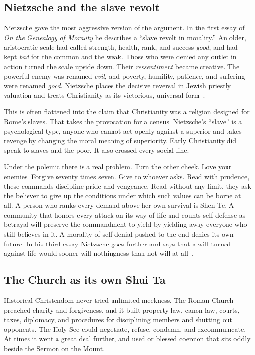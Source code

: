 \documentclass[12pt,a4paper]{book}
\begin{document}
\subsection{Nietzsche and the slave revolt}

Nietzsche gave the most aggressive version of the argument. In the first essay of \emph{On the Genealogy of Morality} he describes a ``slave revolt in morality.'' An older, aristocratic scale had called strength, health, rank, and success \emph{good}, and had kept \emph{bad} for the common and the weak. Those who were denied any outlet in action turned the scale upside down. Their \emph{ressentiment} became creative. The powerful enemy was renamed \emph{evil}, and poverty, humility, patience, and suffering were renamed \emph{good}. Nietzsche places the decisive reversal in Jewish priestly valuation and treats Christianity as its victorious, universal form~\cite[First Essay, \S\S~7--10 and 16]{Nietzsche-GM}.

This is often flattened into the claim that Christianity was a religion designed for Rome's slaves. That takes the provocation for a census. Nietzsche's ``slave'' is a psychological type, anyone who cannot act openly against a superior and takes revenge by changing the moral meaning of superiority. Early Christianity did speak to slaves and the poor. It also crossed every social line.

Under the polemic there is a real problem. Turn the other cheek. Love your enemies. Forgive seventy times seven. Give to whoever asks. Read with prudence, these commands discipline pride and vengeance. Read without any limit, they ask the believer to give up the conditions under which such values can be borne at all. A person who ranks every demand above her own survival is Shen Te. A community that honors every attack on its way of life and counts self-defense as betrayal will preserve the commandment to yield by yielding away everyone who still believes in it. A morality of self-denial pushed to the end denies its own future. In his third essay Nietzsche goes further and says that a will turned against life would sooner will nothingness than not will at all~\cite[Third Essay, \S~28]{Nietzsche-GM}.

\subsection{The Church as its own Shui Ta}

Historical Christendom never tried unlimited meekness. The Roman Church preached charity and forgiveness, and it built property law, canon law, courts, taxes, diplomacy, and procedures for disciplining members and shutting out opponents. The Holy See could negotiate, refuse, condemn, and excommunicate. At times it went a great deal further, and used or blessed coercion that sits oddly beside the Sermon on the Mount.
\end{document}

